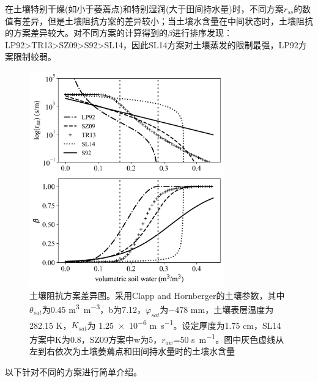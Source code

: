 在土壤特别干燥(如小于萎蔫点)和特别湿润(大于田间持水量)时，不同方案\(r_{ss}\)的数值有差异，但是土壤阻抗方案的差异较小；当土壤水含量在中间状态时，土壤阻抗的方案差异较大。对不同方案的计算得到的$\beta$进行排序发现：LP92\textgreater TR13\textgreater SZ09\textgreater S92\textgreater SL14，因此SL14方案对土壤蒸发的限制最强，LP92方案限制较弱。

{
\begin{figure}[htbp]
\centering
\includegraphics[width=0.75\textwidth]{Figures/地表湍流交换过程/土壤阻抗方案差异图.png}
\caption{土壤阻抗方案差异图。采用Clapp and Hornberger的土壤参数，其中\(\theta_{sat}\)为0.45 \unit{m^{3}.m^{-3}}，b为7.12，\(\varphi_{sat}\)为\num{-478} \unit {mm}，土壤表层温度为282.15 K，\(K_{sat}\)为 \num{1.25e-6} \unit{m.s^{-1}}。设定厚度为1.75 cm，SL14方案中K为0.8，SZ09方案中w为5，\(r_{aw}\)=50 \unit {s.m^{-1}}。图中灰色虚线从左到右依次为土壤萎蔫点和田间持水量时的土壤水含量}
\label{fig:土壤阻抗方案差异图}
\end{figure}
}

以下针对不同的方案进行简单介绍。


